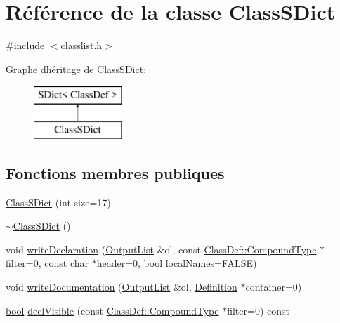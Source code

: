 \hypertarget{class_class_s_dict}{}\section{Référence de la classe Class\+S\+Dict}
\label{class_class_s_dict}


{\ttfamily \#include $<$classlist.\+h$>$}

Graphe d\textquotesingle{}héritage de Class\+S\+Dict\+:\begin{figure}[H]
\begin{center}
\leavevmode
\includegraphics[height=2.000000cm]{class_class_s_dict}
\end{center}
\end{figure}
\subsection*{Fonctions membres publiques}
\begin{DoxyCompactItemize}
\item 
\hyperlink{class_class_s_dict_a436662c1f14f86697c092287cefd4d63}{Class\+S\+Dict} (int size=17)
\item 
\hyperlink{class_class_s_dict_a8f9603a07e5e005aab056a3cc0cfd852}{$\sim$\+Class\+S\+Dict} ()
\item 
void \hyperlink{class_class_s_dict_afbee846a1b92da926114fa89193da408}{write\+Declaration} (\hyperlink{class_output_list}{Output\+List} \&ol, const \hyperlink{class_class_def_ae70cf86d35fe954a94c566fbcfc87939}{Class\+Def\+::\+Compound\+Type} $\ast$filter=0, const char $\ast$header=0, \hyperlink{qglobal_8h_a1062901a7428fdd9c7f180f5e01ea056}{bool} local\+Names=\hyperlink{qglobal_8h_a10e004b6916e78ff4ea8379be80b80cc}{F\+A\+L\+S\+E})
\item 
void \hyperlink{class_class_s_dict_ac05ee6f98ce67d0337337dec0d8cf477}{write\+Documentation} (\hyperlink{class_output_list}{Output\+List} \&ol, \hyperlink{class_definition}{Definition} $\ast$container=0)
\item 
\hyperlink{qglobal_8h_a1062901a7428fdd9c7f180f5e01ea056}{bool} \hyperlink{class_class_s_dict_aae972ac912a3ca22d918c307c3ccd67b}{decl\+Visible} (const \hyperlink{class_class_def_ae70cf86d35fe954a94c566fbcfc87939}{Class\+Def\+::\+Compound\+Type} $\ast$filter=0) const 
\end{DoxyCompactItemize}



